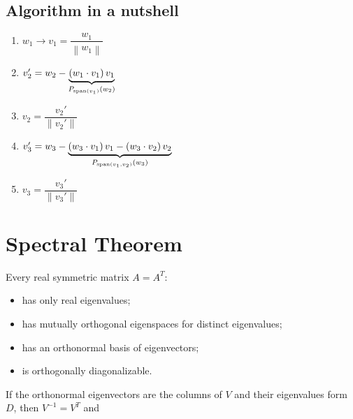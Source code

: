 \documentclass{article}
\begin{document}
\subsection{Algorithm in a nutshell}
\begin{enumerate}[label=Step \arabic*.]
    \item $w_1 \longrightarrow v_1 = \dfrac{w_1}{\left\|w_1\right\|}$
    \item $v_2' = w_2 - \underbrace{\left(w_1 \cdot v_1\right)v_1}_{P_{\operatorname{span}(v_1)}(w_2)}$
    \item $v_2 = \dfrac{v_2'}{\left\|v_2'\right\|}$
    \item $v_3' = w_3 - \underbrace{\left(w_3 \cdot v_1\right)v_1 - \left(w_3 \cdot v_2\right)v_2}_{P_{\operatorname{span}(v_1,v_2)}(w_3)}$
    \item $v_3 = \dfrac{v_3'}{\left\|v_3'\right\|}$
\end{enumerate}

\section{Spectral Theorem}

Every real symmetric matrix $A=A^T$:
\begin{itemize}
    \item has only real eigenvalues;
    \item has mutually orthogonal eigenspaces for distinct eigenvalues;
    \item has an orthonormal basis of eigenvectors;
    \item is orthogonally diagonalizable.
\end{itemize}

If the orthonormal eigenvectors are the columns of
$V$ and their eigenvalues form $D$, then $V^{-1}=V^T$ and
\end{document}
